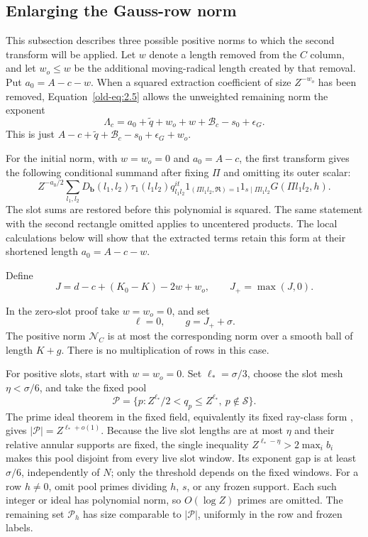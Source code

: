 \documentclass[11pt,a4paper]{article}
\numberwithin{equation}{section}
\numberwithin{figure}{section}
\theoremstyle{definition}
\theoremstyle{remark}
\begin{document}
\subsection{Enlarging the Gauss-row norm}\label{sec:plain-gauss-enlargement}

This subsection describes three possible positive norms to which
the second transform will be applied.  Let \(w\) denote a length
removed from the \(C\) column, and let \(w_o\le w\) be the
additional moving-radical length created by that removal.  Put
\(a_0=A-c-w\).  When a squared extraction coefficient of size
\(Z^{-w_o}\) has been removed, Equation~\eqref{old-eq:2.5}
allows the unweighted remaining norm the exponent
\begin{equation}
 \Lambda_c=
 a_0+\widetilde q+w_o+w+\mathcal B_c-s_0+\epsilon_G.
 \label{old-eq:2.7}
\end{equation}
This is just \(A-c+\widetilde q+\mathcal B_c-s_0+\epsilon_G+w_o\).

For the initial norm, with \(w=w_o=0\) and \(a_0=A-c\), the first
transform gives the following conditional summand after fixing \(\Pi\)
and omitting its outer scalar:
\begin{equation}
 Z^{-a_0/2}\sum_{l_1,l_2}
 D_{\mathbf b}(l_1,l_2)\tau_1(l_1l_2)q_{l_1l_2}^{it}
 1_{(\Pi l_1l_2,\mathfrak R)=1}1_{s\mid\Pi l_1l_2}
 G(\Pi l_1l_2,h).
 \label{old-eq:2.18c}
\end{equation}
The slot sums are restored before this polynomial is squared.
The same statement with the second rectangle omitted applies to
uncentered products.  The local calculations below will show that the
extracted terms retain this form at their shortened length \(a_0=A-c-w\).

Define
\begin{equation}
 J=d-c+(K_0-K)-2w+w_o,\qquad J_+=\max(J,0).
 \label{old-eq:2.8}
\end{equation}

In the zero-slot proof take \(w=w_o=0\), and set
\[
 \ell=0,\qquad g=J_++\sigma.
\]
The positive norm \(\mathcal N_C\) is at most the corresponding
norm over a smooth ball of length \(K+g\).  There is no
multiplication of rows in this case.

For positive slots, start with \(w=w_o=0\).  Set
\(\ell_*=\sigma/3\), choose the slot mesh \(\eta<\sigma/6\),
and take the fixed pool
\[
 \mathcal P=\{p: Z^{\ell_*}/2<q_p\le Z^{\ell_*},\
                    p\notin\mathcal S\}.
\]
The prime ideal theorem in the fixed field, equivalently its fixed
ray-class form \cite[Theorem 1.1]{TZ}, gives
\(|\mathcal P|=Z^{\ell_*+o(1)}\).  Because the live slot lengths
are at most \(\eta\) and their relative annular supports are fixed,
the single inequality
\(Z^{\ell_*-\eta}>2\max_i b_i\) makes this pool disjoint from
every live slot window.  Its exponent gap is at least \(\sigma/6\),
independently of \(N\); only the threshold depends on the fixed
windows.  For a row \(h\ne0\), omit pool primes dividing
\(h\), \(s\), or any frozen support.  Each such integer or ideal
has polynomial norm, so \(O(\log Z)\) primes are omitted.
The remaining set \(\mathcal P_h\) has size comparable to
\(|\mathcal P|\), uniformly in the row and frozen labels.
\end{document}
